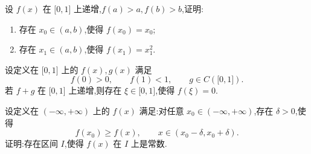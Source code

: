 \documentclass[../数学分析培优讲义.tex]{subfiles}
\begin{document}
\begin{example}
设 $f(x)$ 在 $\lbrack 0,1\rbrack$ 上递增,$f(a)>a,f(b)>b$,证明:
\begin{enumerate}[label=(\arabic*)]
    \item 存在 $x_0\in(a,b)$,使得 $f(x_0)=x_0$;
    \item 存在 $x_1\in(a,b)$,使得 $f(x_1)=x_1^2$.
\end{enumerate}
\end{example}
\exampleblank

\begin{example}
设定义在 $\lbrack 0,1\rbrack$ 上的 $f(x),g(x)$ 满足
\[
    f(0)>0,\qquad f(1)<1,\qquad g\in C(\lbrack 0,1\rbrack).
\]
若 $f+g$ 在 $\lbrack 0,1\rbrack$ 上递增,则存在 $\xi\in\lbrack 0,1\rbrack$,使得 $f(\xi)=0$.
\end{example}
\exampleblank

\begin{example}
设定义在 $(-\infty,+\infty)$ 上的 $f(x)$ 满足:对任意 $x_0\in(-\infty,+\infty)$,存在 $\delta>0$,使得
\[
    f(x_0)\geq f(x),
    \qquad x\in(x_0-\delta,x_0+\delta).
\]
证明:存在区间 $I$,使得 $f(x)$ 在 $I$ 上是常数.
\end{example}
\exampleblank
\end{document}

